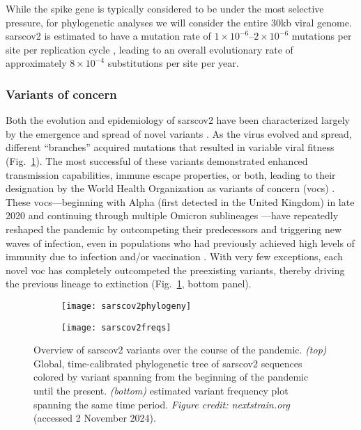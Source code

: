 While the spike gene is typically considered to be under the most selective pressure, for phylogenetic analyses we will consider the entire 30kb viral genome.
\gls{sarscov2} is estimated to have a mutation rate of $1\times10^{-6}$--$2\times10^{-6}$ mutations per site per replication cycle \citep{markov2023evolution}, leading to an overall evolutionary rate of approximately $8\times10^{-4}$ substitutions per site per year.

\subsubsection{Variants of concern}
Both the evolution and epidemiology of \gls{sarscov2} have been characterized largely by the emergence and spread of novel variants \citep{Carabelli2023}.
As the virus evolved and spread, different ``branches'' acquired mutations that resulted in variable viral fitness (Fig.~\ref{fig:sarscov2phylo}).
The most successful of these variants demonstrated enhanced transmission capabilities, immune escape properties, or both, leading to their designation by the World Health Organization as variants of concern (\gls{voc}s) \citep{attwood2022phylogenetic}.
These \gls{voc}s---beginning with Alpha (first detected in the United Kingdom) in late 2020 \citep{volz2021assessing}and continuing through multiple Omicron sublineages \citep{bellusci2023neutralization}---have repeatedly reshaped the pandemic by outcompeting their predecessors and triggering new waves of infection, even in populations who had previously achieved high levels of immunity due to infection and/or vaccination \citep{hu2022increased}.
With very few exceptions, each novel \gls{voc} has completely outcompeted the preexisting variants, thereby driving the previous lineage to extinction (Fig.~\ref{fig:sarscov2phylo}, bottom panel).

\begin{figure}[ht]
  \centering
  \begin{subfigure}{0.9\textwidth}
    \texttt{[image: sarscov2phylogeny]}
  \end{subfigure}
  \begin{subfigure}{0.9\textwidth}
    \texttt{[image: sarscov2freqs]}
  \end{subfigure}
  \caption[SARS-CoV-2 phylogeny and variant frequencies]{Overview of \gls{sarscov2} variants over the course of the pandemic. \textit{(top)} Global, time-calibrated phylogenetic tree of \gls{sarscov2} sequences colored by variant spanning from the beginning of the pandemic until the present. \textit{(bottom)} estimated variant frequency plot spanning the same time period. \textit{Figure credit: nextstrain.org} \citep{hadfield2018nextstrain} (accessed 2 November 2024).}
  \label{fig:sarscov2phylo}
\end{figure}

